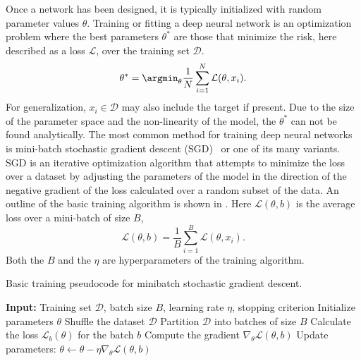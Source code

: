 Once a network has been designed, it is typically initialized with random parameter values $\theta$.
Training or fitting a deep neural network is an optimization problem where the best parameters $\theta^*$ are those that minimize the risk, here described as a loss $\mathcal{L}$, over the training set $\mathcal{D}$.
\begin{equation}
    \theta^* = \argmin_{\theta} \frac{1}{N} \sum_{i=1}^N \mathcal{L}(\theta, x_i).
\end{equation}
For generalization, $x_i \in \mathcal{D}$ may also include the target if present.
Due to the size of the parameter space and the non-linearity of the model, the $\theta^*$ can not be found analytically.
The most common method for training deep neural networks is mini-batch stochastic gradient descent (SGD)~\cite{Perceptron} or one of its many variants.
SGD is an iterative optimization algorithm that attempts to minimize the loss over a dataset by adjusting the parameters of the model in the direction of the negative gradient of the loss calculated over a random subset of the data.
An outline of the basic training algorithm is shown in .
Here $\mathcal{L}(\theta, b)$ is the average loss over a mini-batch of size $B$,
\begin{equation}
    \mathcal{L}(\theta, b) = \frac{1}{B} \sum_{i=1}^B \mathcal{L}(\theta, x_i).
\end{equation}
Both the $B$ and the $\eta$ are hyperparameters of the training algorithm.

\begin{algorithm}
    \caption{Basic training pseudocode for minibatch stochastic gradient descent.}
    \label{alg:gradient_descent}
    \begin{algorithmic}[1]
    \State \textbf{Input:} Training set $\mathcal{D}$, batch size $B$, learning rate $\eta$, stopping criterion
    \State Initialize parameters $\theta$
    \Repeat {}
        \State Shuffle the dataset $\mathcal{D}$
        \State Partition $\mathcal{D}$ into batches of size $B$
            \State Calculate the loss $\mathcal{L}_b(\theta)$ for the batch $b$
            \State Compute the gradient $\nabla_\theta \mathcal{L}(\theta, b)$
            \State Update parameters: $\theta \gets \theta - \eta \nabla_\theta \mathcal{L}(\theta, b)$
        \EndFor
    \end{algorithmic}
\end{algorithm}

